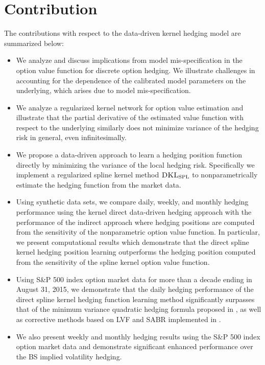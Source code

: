 \documentclass[letterpaper,12pt,titlepage,oneside,final]{book}
\numberwithin{equation}{section}
\theoremstyle{definition}
\newcommand{\DKLs}{\bf\textsc{DKL}_{\text{SPL}}}
\begin{document}
\section{Contribution}
The contributions with respect to the data-driven kernel hedging model \cite{knian2017} are summarized below:
\begin{itemize}
\item We analyze and discuss implications from model mis-specification in the option value function for discrete option hedging. We illustrate challenges in accounting for the dependence of the calibrated model parameters on the underlying, which arises due to  model mis-specification.

\item We analyze a regularized kernel network for option value estimation and illustrate that  the partial derivative of the estimated value function with respect to the underlying similarly does not minimize variance of the hedging risk in general, even infinitesimally.

\item We propose a data-driven approach to learn a hedging position function directly by minimizing the variance of the local hedging  risk.
    Specifically we implement a regularized spline kernel method $\DKLs$ to nonparametrically estimate the hedging function from the market data.

\item Using synthetic data sets, we compare daily, weekly, and monthly hedging performance using
   the kernel direct data-driven hedging approach with the performance of the indirect approach where hedging positions are computed from the sensitivity of the nonparametric option value function. In particular, we present computational results which demonstrate that the direct spline kernel hedging position learning outperforms the hedging position computed from the sensitivity of the spline kernel option value function.

\item Using  S\&P 500 index option market data for more than a decade ending in August 31, 2015, we demonstrate that the  daily hedging performance of the direct spline kernel hedging function learning method  significantly surpasses that of the   minimum variance quadratic hedging formula proposed in \citep{hulloptimal},  as well as corrective methods based on LVF and SABR implemented in  \citep{hulloptimal}.

\item We also present weekly and monthly hedging results using the  S\&P 500 index option market data and demonstrate significant enhanced performance over the BS implied volatility hedging.
\end{itemize}
\end{document}
